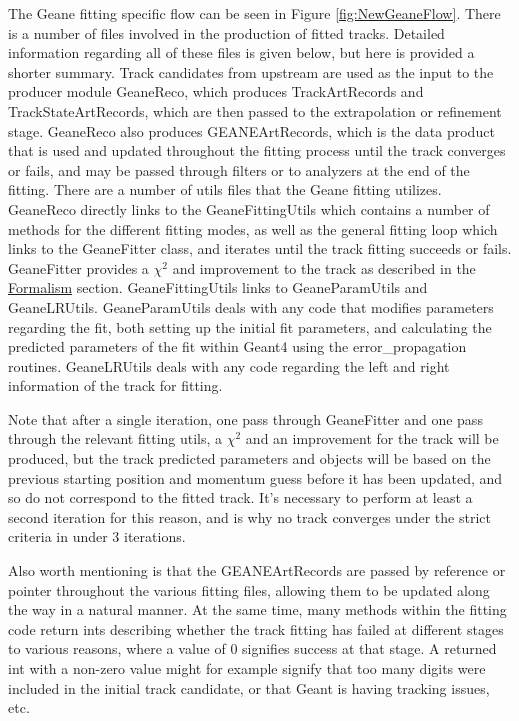     The Geane fitting specific flow can be seen in Figure \ref{fig:NewGeaneFlow}. There is a number of files involved in the production of fitted tracks. Detailed information regarding all of these files is given below, but here is provided a shorter summary. Track candidates from upstream are used as the input to the producer module GeaneReco, which produces TrackArtRecords and TrackStateArtRecords, which are then passed to the extrapolation or refinement stage. GeaneReco also produces GEANEArtRecords, which is the data product that is used and updated throughout the fitting process until the track converges or fails, and may be passed through filters or to analyzers at the end of the fitting. There are a number of utils files that the Geane fitting utilizes. GeaneReco directly links to the GeaneFittingUtils which contains a number of methods for the different fitting modes, as well as the general fitting loop which links to the GeaneFitter class, and iterates until the track fitting succeeds or fails. GeaneFitter provides a $\chi^{2}$ and improvement to the track as described in the \hyperref[sec:Formalism]{Formalism} section. GeaneFittingUtils links to GeaneParamUtils and GeaneLRUtils. GeaneParamUtils deals with any code that modifies parameters regarding the fit, both setting up the initial fit parameters, and calculating the predicted parameters of the fit within Geant4 using the error\_propagation routines. GeaneLRUtils deals with any code regarding the left and right information of the track for fitting.
    
    Note that after a single iteration, one pass through GeaneFitter and one pass through the relevant fitting utils, a $\chi^{2}$ and an improvement for the track will be produced, but the track predicted parameters and objects will be based on the previous starting position and momentum guess before it has been updated, and so do not correspond to the fitted track. It's necessary to perform at least a second iteration for this reason, and is why no track converges under the strict criteria in under 3 iterations.

    Also worth mentioning is that the GEANEArtRecords are passed by reference or pointer throughout the various fitting files, allowing them to be updated along the way in a natural manner. At the same time, many methods within the fitting code return ints describing whether the track fitting has failed at different stages to various reasons, where a value of 0 signifies success at that stage. A returned int with a non-zero value might for example signify that too many digits were included in the initial track candidate, or that Geant is having tracking issues, etc.


